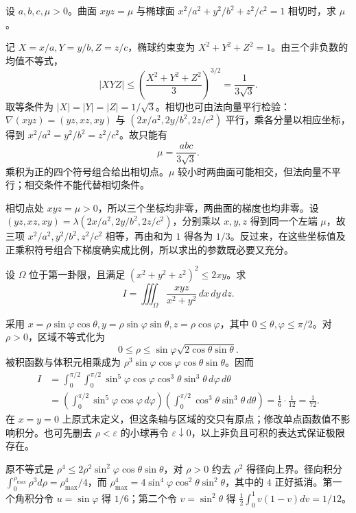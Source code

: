 \documentclass[12pt,fontset=fandol]{ctexart}
\begin{document}
\begin{example}\label{nm-2019-1e}
设 $a,b,c,\mu>0$。曲面 $xyz=\mu$ 与椭球面 $x^2/a^2+y^2/b^2+z^2/c^2=1$ 相切时，求 $\mu$。
\end{example}
\begin{solve}
记 $X=x/a,Y=y/b,Z=z/c$，椭球约束变为 $X^2+Y^2+Z^2=1$。由三个非负数的均值不等式，
\[
 |XYZ|\leq\left(\frac{X^2+Y^2+Z^2}{3}\right)^{3/2}
 =\frac1{3\sqrt3}.
\]
取等条件为 $|X|=|Y|=|Z|=1/\sqrt3$。相切也可由法向量平行检验：$\nabla(xyz)=(yz,xz,xy)$ 与 $(2x/a^2,2y/b^2,2z/c^2)$ 平行，乘各分量以相应坐标，得到 $x^2/a^2=y^2/b^2=z^2/c^2$。故只能有
\[
 \mu=\frac{abc}{3\sqrt3}.
\]
乘积为正的四个符号组合给出相切点。$\mu$ 较小时两曲面可能相交，但法向量不平行；相交条件不能代替相切条件。

相切点处 $xyz=\mu>0$，所以三个坐标均非零，两曲面的梯度也均非零。设 $(yz,xz,xy)=\lambda(2x/a^2,2y/b^2,2z/c^2)$，分别乘以 $x,y,z$ 得到同一个左端 $\mu$，故三项 $x^2/a^2,y^2/b^2,z^2/c^2$ 相等，再由和为 $1$ 得各为 $1/3$。反过来，在这些坐标值及正乘积符号组合下梯度确实成比例，所以求出的参数既必要又充分。

\end{solve}

\begin{example}\label{nm-2019-2}
设 $\Omega$ 位于第一卦限，且满足 $(x^2+y^2+z^2)^2\leq2xy$。求
\[
 I=\iiint_\Omega\frac{xyz}{x^2+y^2}\,dx\,dy\,dz.
\]
\end{example}
\begin{solve}
采用 $x=\rho\sin\varphi\cos\theta,y=\rho\sin\varphi\sin\theta,z=\rho\cos\varphi$，其中 $0\leq\theta,\varphi\leq\pi/2$。对 $\rho>0$，区域不等式化为
\[
 0\leq\rho\leq\sin\varphi\sqrt{2\cos\theta\sin\theta}.
\]
被积函数与体积元相乘成为 $\rho^3\sin\varphi\cos\varphi\cos\theta\sin\theta$。因而
\begin{align*}
 I&=\int_0^{\pi/2}\int_0^{\pi/2}
 \sin^5\varphi\cos\varphi\cos^3\theta\sin^3\theta\,d\varphi\,d\theta\\
 &=\left(\int_0^{\pi/2}\sin^5\varphi\cos\varphi\,d\varphi\right)
 \left(\int_0^{\pi/2}\cos^3\theta\sin^3\theta\,d\theta\right)
 =\frac16\cdot\frac1{12}=\frac1{72}.
\end{align*}
在 $x=y=0$ 上原式未定义，但这条轴与区域的交只有原点；修改单点函数值不影响积分。也可先删去 $\rho<\varepsilon$ 的小球再令 $\varepsilon\downarrow0$，以上非负且可积的表达式保证极限存在。

原不等式是 $\rho^4\le2\rho^2\sin^2\varphi\cos\theta\sin\theta$，对 $\rho>0$ 约去 $\rho^2$ 得径向上界。径向积分 $\int_0^{\rho_{\max}}\rho^3d\rho=\rho_{\max}^4/4$，而 $\rho_{\max}^4=4\sin^4\varphi\cos^2\theta\sin^2\theta$，其中的 $4$ 正好抵消。第一个角积分令 $u=\sin\varphi$ 得 $1/6$；第二个令 $v=\sin^2\theta$ 得 $\tfrac12\int_0^1v(1-v)dv=1/12$。

\end{solve}
\end{document}
